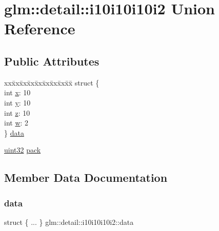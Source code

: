 \hypertarget{unionglm_1_1detail_1_1i10i10i10i2}{}\section{glm\+:\+:detail\+:\+:i10i10i10i2 Union Reference}
\label{unionglm_1_1detail_1_1i10i10i10i2}
\subsection*{Public Attributes}
\begin{DoxyCompactItemize}
\item 
\begin{tabbing}
xx\=xx\=xx\=xx\=xx\=xx\=xx\=xx\=xx\=\kill
struct \{\\
\>int \mbox{\hyperlink{unionglm_1_1detail_1_1i10i10i10i2_a290d519ee2feaba6ae4b5244d5d90e7b}{x}}: 10\\
\>int \mbox{\hyperlink{unionglm_1_1detail_1_1i10i10i10i2_ae76bb89adeb66d1ee5bb2b265e87fc1b}{y}}: 10\\
\>int \mbox{\hyperlink{unionglm_1_1detail_1_1i10i10i10i2_a95398090414de32eaaf9cb3c3bd3fa48}{z}}: 10\\
\>int \mbox{\hyperlink{unionglm_1_1detail_1_1i10i10i10i2_a20c12acbdb874a476b158164acd17abd}{w}}: 2\\
\} \mbox{\hyperlink{unionglm_1_1detail_1_1i10i10i10i2_a425fea084366cd3c538f626e29cd63e0}{data}}\\

\end{tabbing}\item 
\mbox{\hyperlink{namespaceglm_1_1detail_ade6cfbf377022aaa391af8cd50489222}{uint32}} \mbox{\hyperlink{unionglm_1_1detail_1_1i10i10i10i2_a24e2dc324c86589d568dc330904c859a}{pack}}
\end{DoxyCompactItemize}


\subsection{Member Data Documentation}
\mbox{\label{unionglm_1_1detail_1_1i10i10i10i2_a425fea084366cd3c538f626e29cd63e0}} 
\subsubsection{\texorpdfstring{data}{data}}
{\footnotesize\ttfamily struct \{ ... \}   glm\+::detail\+::i10i10i10i2\+::data}

